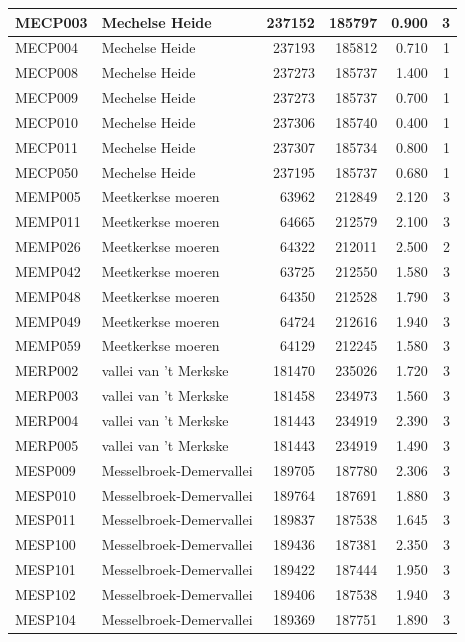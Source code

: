 \documentclass[11pt,]{book}
\begin{document}
\begin{table}
\begin{tabular}[t]{l|l|r|r|r|r}
\hline
MECP003 & Mechelse Heide & 237152 & 185797 & 0.900 & 3\\
\hline
MECP004 & Mechelse Heide & 237193 & 185812 & 0.710 & 1\\
\hline
MECP008 & Mechelse Heide & 237273 & 185737 & 1.400 & 1\\
\hline
MECP009 & Mechelse Heide & 237273 & 185737 & 0.700 & 1\\
\hline
MECP010 & Mechelse Heide & 237306 & 185740 & 0.400 & 1\\
\hline
MECP011 & Mechelse Heide & 237307 & 185734 & 0.800 & 1\\
\hline
MECP050 & Mechelse Heide & 237195 & 185737 & 0.680 & 1\\
\hline
MEMP005 & Meetkerkse moeren & 63962 & 212849 & 2.120 & 3\\
\hline
MEMP011 & Meetkerkse moeren & 64665 & 212579 & 2.100 & 3\\
\hline
MEMP026 & Meetkerkse moeren & 64322 & 212011 & 2.500 & 2\\
\hline
MEMP042 & Meetkerkse moeren & 63725 & 212550 & 1.580 & 3\\
\hline
MEMP048 & Meetkerkse moeren & 64350 & 212528 & 1.790 & 3\\
\hline
MEMP049 & Meetkerkse moeren & 64724 & 212616 & 1.940 & 3\\
\hline
MEMP059 & Meetkerkse moeren & 64129 & 212245 & 1.580 & 3\\
\hline
MERP002 & vallei van 't Merkske & 181470 & 235026 & 1.720 & 3\\
\hline
MERP003 & vallei van 't Merkske & 181458 & 234973 & 1.560 & 3\\
\hline
MERP004 & vallei van 't Merkske & 181443 & 234919 & 2.390 & 3\\
\hline
MERP005 & vallei van 't Merkske & 181443 & 234919 & 1.490 & 3\\
\hline
MESP009 & Messelbroek-Demervallei & 189705 & 187780 & 2.306 & 3\\
\hline
MESP010 & Messelbroek-Demervallei & 189764 & 187691 & 1.880 & 3\\
\hline
MESP011 & Messelbroek-Demervallei & 189837 & 187538 & 1.645 & 3\\
\hline
MESP100 & Messelbroek-Demervallei & 189436 & 187381 & 2.350 & 3\\
\hline
MESP101 & Messelbroek-Demervallei & 189422 & 187444 & 1.950 & 3\\
\hline
MESP102 & Messelbroek-Demervallei & 189406 & 187538 & 1.940 & 3\\
\hline
MESP104 & Messelbroek-Demervallei & 189369 & 187751 & 1.890 & 3\\

\end{tabular}
\end{table}
\end{document}
